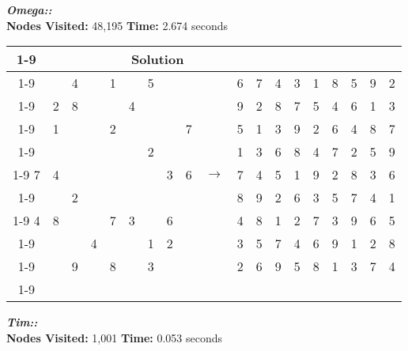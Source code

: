 \documentclass{article}
\begin{document}
\newline
\newline
\small\emph{\textbf{Omega::}}\\ \textbf{Nodes Visited:} 48,195 \textbf{Time:} 2.674 seconds\\
\begin{tabular}{||c|c|c||c|c|c||c|c|c|| c ||c|c|c||c|c|c||c|c|c||}
  \cmidrule{1-9} \cmidrule{11-19}
  \multicolumn{9}{|c|}{Problem} &                   & \multicolumn{9}{|c|}{Solution}   \\\cmidrule{1-9} \cmidrule{11-19} \morecmidrules \cmidrule{1-9} \cmidrule{11-19}
    &   & 4 &   & 1 &   & 5 &   &   &               & 6 & 7 & 4 & 3 & 1 & 8 & 5 & 9 & 2\\\cmidrule{1-9} \cmidrule{11-19}
    & 2 & 8 &   &   & 4 &   &   &   &               & 9 & 2 & 8 & 7 & 5 & 4 & 6 & 1 & 3\\\cmidrule{1-9} \cmidrule{11-19}
    & 1 &   &   & 2 &   &   &   & 7 &               & 5 & 1 & 3 & 9 & 2 & 6 & 4 & 8 & 7\\\cmidrule{1-9} \cmidrule{11-19} \morecmidrules \cmidrule{1-9} \cmidrule{11-19}
    &   &   &   &   &   & 2 &   &   &               & 1 & 3 & 6 & 8 & 4 & 7 & 2 & 5 & 9\\\cmidrule{1-9} \cmidrule{11-19}
  7 & 4 &   &   &   &   &   & 3 & 6 & $\rightarrow$ & 7 & 4 & 5 & 1 & 9 & 2 & 8 & 3 & 6\\\cmidrule{1-9} \cmidrule{11-19}
    &   & 2 &   &   &   &   &   &   &               & 8 & 9 & 2 & 6 & 3 & 5 & 7 & 4 & 1\\\cmidrule{1-9} \cmidrule{11-19} \morecmidrules \cmidrule{1-9} \cmidrule{11-19}
  4 & 8 &   &   & 7 & 3 &   & 6 &   &               & 4 & 8 & 1 & 2 & 7 & 3 & 9 & 6 & 5\\\cmidrule{1-9} \cmidrule{11-19}
    &   &   & 4 &   &   & 1 & 2 &   &               & 3 & 5 & 7 & 4 & 6 & 9 & 1 & 2 & 8\\\cmidrule{1-9} \cmidrule{11-19}
    &   & 9 &   & 8 &   & 3 &   &   &               & 2 & 6 & 9 & 5 & 8 & 1 & 3 & 7 & 4\\\cmidrule{1-9} \cmidrule{11-19} \morecmidrules \cmidrule{1-9} \cmidrule{11-19}
 \end{tabular}
\newpage
\small\emph{\textbf{Tim::}}\\ \textbf{Nodes Visited:} 1,001 \textbf{Time:} 0.053 seconds\\
\end{document}
